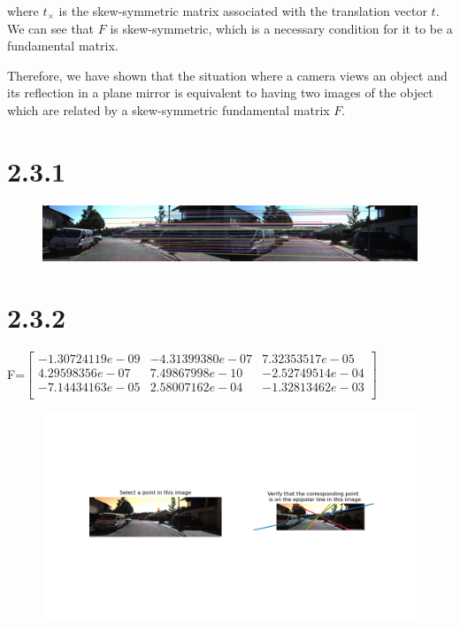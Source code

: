 \documentclass{article}
\begin{document}
    where $t_\times$ is the skew-symmetric matrix associated with the translation vector $t$. We can see that $F$ is skew-symmetric, which is a necessary condition for it to be a fundamental matrix.
    
    Therefore, we have shown that the situation where a camera views an object and its reflection in a plane mirror is equivalent to having two images of the object which are related by a skew-symmetric fundamental matrix $F$.
    \section*{2.3.1}

    \begin{figure}[H]
        \centering
              \includegraphics[width=0.9\linewidth]{../homework/2_3_1_fig1.png}
    \end{figure}

    \section*{2.3.2}

    F=$\begin{bmatrix}
        -1.30724119e-09 & -4.31399380e-07 &  7.32353517e-05\\
        4.29598356e-07 &  7.49867998e-10 & -2.52749514e-04\\
        -7.14434163e-05 &  2.58007162e-04 & -1.32813462e-03\\
    \end{bmatrix}$\\
    \begin{figure}[H]
        \centering
              \includegraphics[width=0.9\linewidth]{../homework/2_3_2_displayEpipolarF.png}
    \end{figure}
\end{document}

